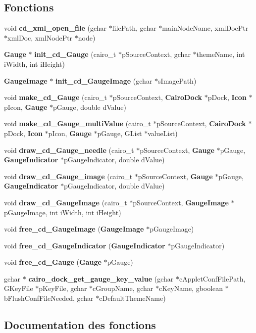 \subsection*{Fonctions}
\begin{CompactItemize}
\item 
void {\bf cd\_\-xml\_\-open\_\-file} (gchar $\ast$filePath, gchar $\ast$mainNodeName, xmlDocPtr $\ast$xmlDoc, xmlNodePtr $\ast$node)
\item 
{\bf Gauge} $\ast$ {\bf init\_\-cd\_\-Gauge} (cairo\_\-t $\ast$pSourceContext, gchar $\ast$themeName, int iWidth, int iHeight)
\item 
{\bf GaugeImage} $\ast$ {\bf init\_\-cd\_\-GaugeImage} (gchar $\ast$sImagePath)
\item 
void {\bf make\_\-cd\_\-Gauge} (cairo\_\-t $\ast$pSourceContext, {\bf CairoDock} $\ast$pDock, {\bf Icon} $\ast$pIcon, {\bf Gauge} $\ast$pGauge, double dValue)
\item 
void {\bf make\_\-cd\_\-Gauge\_\-multiValue} (cairo\_\-t $\ast$pSourceContext, {\bf CairoDock} $\ast$pDock, {\bf Icon} $\ast$pIcon, {\bf Gauge} $\ast$pGauge, GList $\ast$valueList)
\item 
void {\bf draw\_\-cd\_\-Gauge\_\-needle} (cairo\_\-t $\ast$pSourceContext, {\bf Gauge} $\ast$pGauge, {\bf GaugeIndicator} $\ast$pGaugeIndicator, double dValue)
\item 
void {\bf draw\_\-cd\_\-Gauge\_\-image} (cairo\_\-t $\ast$pSourceContext, {\bf Gauge} $\ast$pGauge, {\bf GaugeIndicator} $\ast$pGaugeIndicator, double dValue)
\item 
void {\bf draw\_\-cd\_\-GaugeImage} (cairo\_\-t $\ast$pSourceContext, {\bf GaugeImage} $\ast$pGaugeImage, int iWidth, int iHeight)
\item 
void {\bf free\_\-cd\_\-GaugeImage} ({\bf GaugeImage} $\ast$pGaugeImage)
\item 
void {\bf free\_\-cd\_\-GaugeIndicator} ({\bf GaugeIndicator} $\ast$pGaugeIndicator)
\item 
void {\bf free\_\-cd\_\-Gauge} ({\bf Gauge} $\ast$pGauge)
\item 
gchar $\ast$ {\bf cairo\_\-dock\_\-get\_\-gauge\_\-key\_\-value} (gchar $\ast$cAppletConfFilePath, GKeyFile $\ast$pKeyFile, gchar $\ast$cGroupName, gchar $\ast$cKeyName, gboolean $\ast$bFlushConfFileNeeded, gchar $\ast$cDefaultThemeName)
\end{CompactItemize}


\subsection{Documentation des fonctions}
